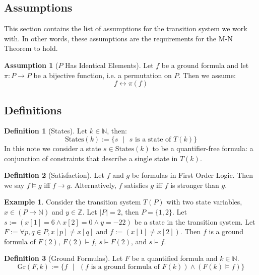 \documentclass[12pt]{article}
\theoremstyle{definition}
\newtheorem{assumption}{Assumption}
\newtheorem{definition}{Definition}
\newtheorem{example}{Example}
\theoremstyle{remark}
\newcommand{\st}{\text{ }|\text{ }}
\newcommand{\states}{\text{States}}
\newcommand{\gr}{\text{Gr}}
\begin{document}
\subsection{Assumptions}
This section contains the list of assumptions for the transition system we work with.  In other words, these assumptions are the requirements for the M-N Theorem to hold.

\begin{assumption}[$P$ Has Identical Elements]
  \label{asmp:ident}
  Let $f$ be a ground formula and let $\pi : P \to P$ be a bijective function, i.e. a permutation on $P$.  Then we assume:
  $$f \leftrightarrow \pi(f)$$
\end{assumption}

\subsection{Definitions}
\begin{definition}[States]
  Let $k \in \mathbb{N}$, then:
  $$\states(k) := \{s \st s \text{ is a state of } T(k)\}$$
  In this note we consider a state $s \in \states(k)$ to be a quantifier-free formula: a conjunction of constraints that describe a single state in $T(k)$.
\end{definition}

\begin{definition}[Satisfaction]
  Let $f$ and $g$ be formulas in First Order Logic.  Then we say $f \models g$ iff $f \rightarrow g$.  Alternatively, $f$ satisfies $g$ iff $f$ is stronger than $g$.
\end{definition}
\begin{example}
  Consider the transition system $T(P)$ with two state variables, $x \in (P \to \mathbb{N})$ and $y \in \mathbb{Z}$.  Let $|P|=2$, then $P=\{1,2\}$.  Let $s := (x[1]=6 \land x[2]=0 \land y=-22)$ be a state in the transition system.  Let $F := \forall p,q \in P, x[p] \neq x[q]$ and $f := (x[1] \neq x[2])$.  Then $f$ is a ground formula of $F(2)$, $F(2) \models f$, $s \models F(2)$, and $s \models f$.
\end{example}

\begin{definition}[Ground Formulas]
  Let $F$ be a quantified formula and $k \in \mathbb{N}$.
  $$\gr(F,k) := \{f \st (f \text{ is a ground formula of } F(k)) \land (F(k) \models f)\}$$
\end{definition}
\end{document}
